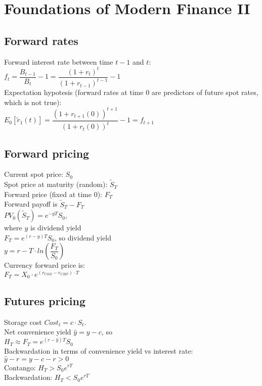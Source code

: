 \section{Foundations of Modern Finance II}
\subsection*{Forward rates}
Forward interest rate between time $t-1$ and $t$:\\
$f_t=\dfrac{B_{t-1}}{B_t} - 1=\dfrac{(1+r_t)^t}{(1+r_{t-1})^{t-1}} - 1$\\
Expectation hypotesis (forward rates at time $0$ are predictors of future spot rates, which is not true):\\
$E_0[\tilde{r}_1(t)] = \dfrac{\left(1+r_{t+1}(0)\right)^{t+1}}{\left(1+r_t(0)\right)^t} - 1= f_{t+1}$
\subsection*{Forward pricing}
Current spot price: $S_0$ \\
Spot price at maturity (random): $\tilde{S}_T$\\
Forward price (fixed at time $0$): $F_T$ \\
Forward payoff is $\tilde{S}_T - F_T$\\
$PV_0(\tilde{S}_T) = e^{-yT}S_0$,\\ where $y$ is dividend yield \\
$F_T=e^{(r-y)T}S_0$, so dividend yield\\ $y = r- T\cdot ln\left(\dfrac{F_T}{S_0}\right)$\\
Currency forward price is:\\
$F_T=X_0\cdot e^{(r_{USD}-r_{CHF})\cdot T}$
\subsection*{Futures pricing}
Storage cost $Cost_t = c\cdot S_t$.\\
Net convenience yield $\hat{y} = y - c$, so\\
$H_T \approx F_T = e^{(r-\hat{y})T}S_0$\\
Backwardation in terms of convenience yield vs interest rate:
$\hat{y} - r = y - c -r > 0$\\
Contango: $H_T > S_0e^{rT}$\\
Backwardation: $H_T < S_0e^{rT}$
